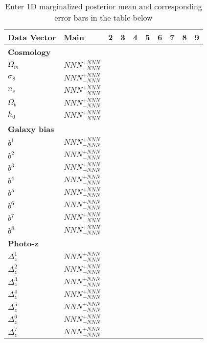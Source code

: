 \documentclass{article}
\begin{document}

\begin{table}
\footnotesize
\centering
\caption{Enter 1D marginalized posterior mean and corresponding error bars in the table below}
\begin{tabular}{l l l l l l l l l l}
\hline\hline
Data Vector &  Main & 2 & 3 & 4 & 5 & 6 & 7 & 8 & 9   \\  
\hline 
\multicolumn{10}{l}{\textbf{Cosmology}} \\
$\Omega_m$ & $NNN^{+NNN}_{-NNN}$ & & & & & & & &  \\ 
$\sigma_8$ & $NNN^{+NNN}_{-NNN}$ & & & & & & & &  \\ 
$n_s$ & $NNN^{+NNN}_{-NNN}$ & & & & & & & & \\
$\Omega_b$ & $NNN^{+NNN}_{-NNN}$ & & & & & & & & \\
$h_0$ & $NNN^{+NNN}_{-NNN}$ & & & & & & & & \\
\hline
\multicolumn{10}{l}{\textbf{Galaxy bias}} \\
$b^1$  & $NNN^{+NNN}_{-NNN}$ & & & & & & & &  \\
$b^2$  & $NNN^{+NNN}_{-NNN}$ & & & & & & & &  \\
$b^3$  & $NNN^{+NNN}_{-NNN}$ & & & & & & & &  \\
$b^4$  & $NNN^{+NNN}_{-NNN}$ & & & & & & & &  \\
$b^5$  & $NNN^{+NNN}_{-NNN}$ & & & & & & & &  \\
$b^6$  & $NNN^{+NNN}_{-NNN}$ & & & & & & & &  \\
$b^7$  & $NNN^{+NNN}_{-NNN}$ & & & & & & & &  \\
$b^8$  & $NNN^{+NNN}_{-NNN}$ & & & & & & & &  \\
\hline
\multicolumn{10}{l}{\textbf{Photo-z}} \\
$\Delta_{z}^1$ & $NNN^{+NNN}_{-NNN}$ & & & & & & & & \\
$\Delta_{z}^2$ & $NNN^{+NNN}_{-NNN}$ & & & & & & & & \\
$\Delta_{z}^3$ & $NNN^{+NNN}_{-NNN}$ & & & & & & & & \\
$\Delta_{z}^4$ & $NNN^{+NNN}_{-NNN}$ & & & & & & & & \\
$\Delta_{z}^5$ & $NNN^{+NNN}_{-NNN}$ & & & & & & & & \\
$\Delta_{z}^6$ & $NNN^{+NNN}_{-NNN}$ & & & & & & & & \\
$\Delta_{z}^7$ & $NNN^{+NNN}_{-NNN}$ & & & & & & & & \\

\end{tabular}
\end{table}
\end{document}
